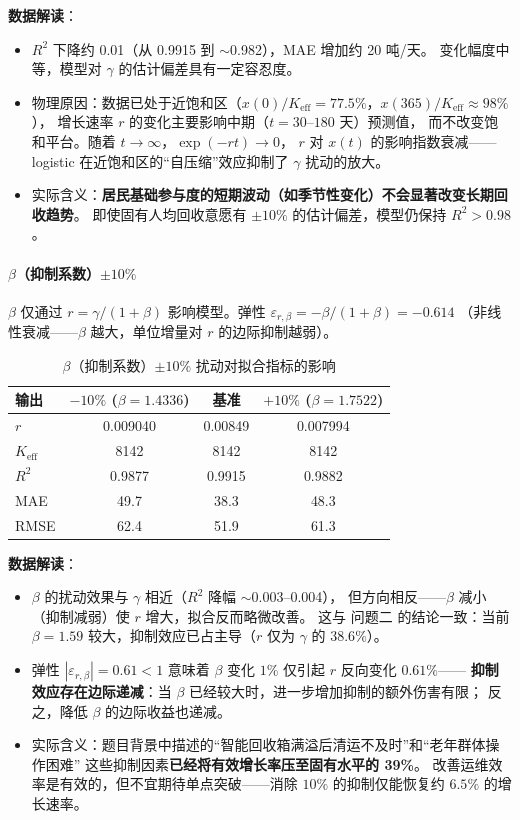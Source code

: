 \documentclass[12pt,a4paper]{ctexart}
\begin{document}
\textbf{数据解读}：
\begin{itemize}
  \item $R^2$ 下降约 0.01（从 0.9915 到 $\sim$0.982），MAE 增加约 20 吨/天。
        变化幅度中等，模型对 $\gamma$ 的估计偏差具有一定容忍度。
  \item 物理原因：数据已处于近饱和区（$x(0)/K_{\text{eff}} = 77.5\%$，$x(365)/K_{\text{eff}} \approx 98\%$），
        增长速率 $r$ 的变化主要影响中期（$t = 30$--$180$ 天）预测值，
        而不改变饱和平台。随着 $t \to \infty$，$\exp(-rt) \to 0$，
        $r$ 对 $x(t)$ 的影响指数衰减——logistic 在近饱和区的``自压缩''效应抑制了 $\gamma$ 扰动的放大。
  \item 实际含义：\textbf{居民基础参与度的短期波动（如季节性变化）不会显著改变长期回收趋势}。
        即使固有人均回收意愿有 $\pm 10\%$ 的估计偏差，模型仍保持 $R^2 > 0.98$。
\end{itemize}

\paragraph{$\beta$（抑制系数）$\pm 10\%$}

$\beta$ 仅通过 $r = \gamma/(1+\beta)$ 影响模型。弹性 $\varepsilon_{r,\beta} = -\beta/(1+\beta) = -0.614$
（非线性衰减——$\beta$ 越大，单位增量对 $r$ 的边际抑制越弱）。

\begin{table}[htbp]
\centering
\caption{$\beta$（抑制系数）$\pm 10\%$ 扰动对拟合指标的影响}
\label{tab:sens_beta}
\begin{tabular}{lccc}
\toprule
输出 & $-10\%$ ($\beta = 1.4336$) & 基准 & $+10\%$ ($\beta = 1.7522$) \\
\midrule
$r$      & 0.009040 & 0.00849 & 0.007994 \\
$K_{\text{eff}}$ & 8142 & 8142 & 8142 \\
$R^2$    & 0.9877 & 0.9915 & 0.9882 \\
MAE      & 49.7 & 38.3 & 48.3 \\
RMSE     & 62.4 & 51.9 & 61.3 \\
\bottomrule
\end{tabular}
\end{table}

\textbf{数据解读}：
\begin{itemize}
  \item $\beta$ 的扰动效果与 $\gamma$ 相近（$R^2$ 降幅 $\sim$0.003--0.004），
        但方向相反——$\beta$ 减小（抑制减弱）使 $r$ 增大，拟合反而略微改善。
        这与 问题二 的结论一致：当前 $\beta = 1.59$ 较大，抑制效应已占主导（$r$ 仅为 $\gamma$ 的 $38.6\%$）。
  \item 弹性 $|\varepsilon_{r,\beta}| = 0.61 < 1$ 意味着 $\beta$ 变化 $1\%$ 仅引起 $r$ 反向变化 $0.61\%$——
        \textbf{抑制效应存在边际递减}：当 $\beta$ 已经较大时，进一步增加抑制的额外伤害有限；
        反之，降低 $\beta$ 的边际收益也递减。
  \item 实际含义：题目背景中描述的``智能回收箱满溢后清运不及时''和``老年群体操作困难''
        这些抑制因素\textbf{已经将有效增长率压至固有水平的 39\%}。
        改善运维效率是有效的，但不宜期待单点突破——消除 $10\%$ 的抑制仅能恢复约 $6.5\%$ 的增长速率。
\end{itemize}
\end{document}

